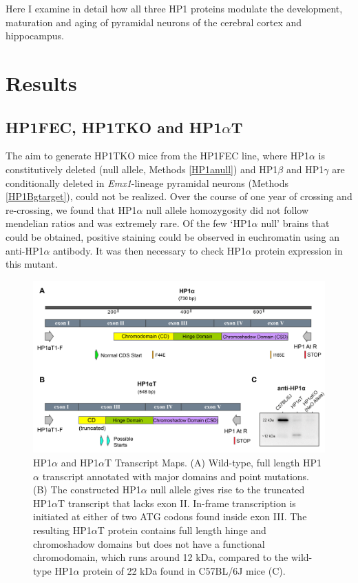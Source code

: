 \documentclass[onehalf,12pt]{beavtex}
\begin{document}
  Here I examine in detail how all three HP1 proteins modulate the
  development, maturation and aging of pyramidal neurons of the cerebral
  cortex and hippocampus.
  
  \chapter{Results}\label{results}
  
  \section{\texorpdfstring{HP1FEC, HP1TKO and
  HP1\(\alpha\)T}{HP1FEC, HP1TKO and HP1\textbackslash{}alphaT}}\label{HP1aT}
  
  The aim to generate HP1TKO mice from the HP1FEC line, where
  HP1\(\alpha\) is constitutively deleted (null allele, Methods
  \ref{HP1anull}) and HP1\(\beta\) and HP1\(\gamma\) are conditionally
  deleted in \emph{Emx1}-lineage pyramidal neurons (Methods
  \ref{HP1Bgtarget}), could not be realized. Over the course of one year
  of crossing and re-crossing, we found that HP1\(\alpha\) null allele
  homozygosity did not follow mendelian ratios and was extremely rare. Of
  the few `HP1\(\alpha\) null' brains that could be obtained, positive
  staining could be observed in euchromatin using an anti-HP1\(\alpha\)
  antibody. It was then necessary to check HP1\(\alpha\) protein
  expression in this mutant.
  
  \begin{figure}
  
  {\centering \includegraphics[width=1\linewidth, ]{./figure/results/HP1aTmap} 
  
  }
  
  \caption[HP1$\alpha$ and HP1$\alpha$T Transcript Maps]{HP1$\alpha$ and HP1$\alpha$T Transcript Maps.  (A) Wild-type, full length HP1$\alpha$ transcript annotated with major domains and point mutations. (B) The constructed HP1$\alpha$ null allele gives rise to the truncated HP1$\alpha$T transcript that lacks exon II.  In-frame transcription is initiated at either of two ATG codons found inside exon III.  The resulting HP1$\alpha$T protein contains full length hinge and chromoshadow domains but does not have a functional chromodomain, which runs around 12 kDa, compared to the wild-type HP1$\alpha$ protein of 22 kDa found in C57BL/6J mice (C).}\label{fig:HP1aTmap}
  \end{figure}
  
\end{document}
